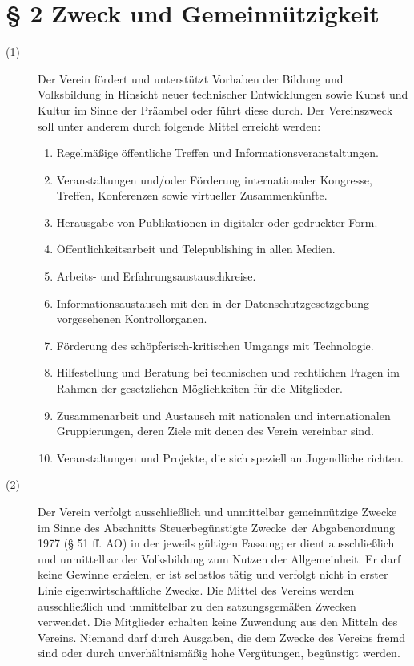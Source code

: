 \documentclass[12pt,paper=a4,ngerman]{scrreprt}
\begin{document}
\section{\S{} 2 Zweck und Gemeinnützigkeit}
\begin{description}
	\item[(1)] Der Verein fördert und unterstützt Vorhaben der Bildung und Volksbildung in Hinsicht neuer technischer Entwicklungen sowie Kunst und Kultur im Sinne der Präambel oder führt diese durch. Der Vereinszweck soll unter anderem durch folgende Mittel erreicht werden:
	\begin{enumerate}
		\item Regelmäßige öffentliche Treffen und Informationsveranstaltungen.
		\item Veranstaltungen und/oder Förderung internationaler Kongresse, Treffen, Konferenzen sowie virtueller Zusammenkünfte.
		\item Herausgabe von Publikationen in digitaler oder gedruckter Form.
		\item Öffentlichkeitsarbeit und Telepublishing in allen Medien.
		\item Arbeits- und Erfahrungsaustauschkreise.
		\item Informationsaustausch mit den in der Datenschutzgesetzgebung vorgesehenen Kontrollorganen.
		\item Förderung des schöpferisch-kritischen Umgangs mit Technologie.
		\item Hilfestellung und Beratung bei technischen und rechtlichen Fragen im Rahmen der gesetzlichen Möglichkeiten für die Mitglieder.
		\item Zusammenarbeit und Austausch mit nationalen und internationalen Gruppierungen, deren Ziele mit denen des Verein vereinbar sind.
		\item Veranstaltungen und Projekte, die sich speziell an Jugendliche richten.
	\end{enumerate}
\item[(2)] Der Verein verfolgt ausschließlich und unmittelbar gemeinnützige Zwecke im Sinne des Abschnitts \glqq Steuerbegünstigte Zwecke\grqq ~der Abgabenordnung 1977 (§ 51 ff. AO) in der jeweils gültigen Fassung; er dient ausschließlich und unmittelbar der Volksbildung zum Nutzen der Allgemeinheit. Er darf keine Gewinne erzielen, er ist selbstlos tätig und verfolgt nicht in erster Linie eigenwirtschaftliche Zwecke. Die Mittel des Vereins werden ausschließlich und unmittelbar zu den satzungsgemäßen Zwecken verwendet. Die Mitglieder erhalten keine Zuwendung aus den Mitteln des Vereins. Niemand darf durch Ausgaben, die dem Zwecke des Vereins fremd sind oder durch unverhältnismäßig hohe Vergütungen, begünstigt werden.
\end{description}
\end{document}
